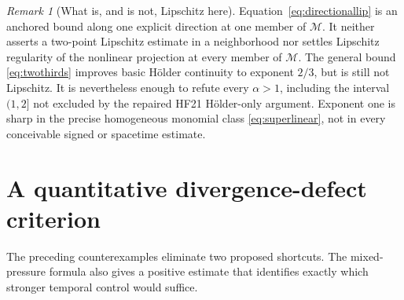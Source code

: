 \documentclass[11pt,a4paper]{article}
\theoremstyle{definition}
\theoremstyle{remark}
\newtheorem{remark}[theorem]{Remark}
\newcommand{\M}{\mathcal M}
\numberwithin{equation}{section}
\begin{document}
\begin{remark}[What is, and is not, Lipschitz here]
Equation~\eqref{eq:directionallip} is an anchored bound along one explicit direction at one member of \(\M\). It neither asserts a two-point Lipschitz estimate in a neighborhood nor settles Lipschitz regularity of the nonlinear projection at every member of \(\M\). The general bound \eqref{eq:twothirds} improves basic Hölder continuity to exponent \(2/3\), but is still not Lipschitz. It is nevertheless enough to refute every \(\alpha>1\), including the interval \((1,2]\) not excluded by the repaired HF21 Hölder-only argument. Exponent one is sharp in the precise homogeneous monomial class \eqref{eq:superlinear}, not in every conceivable signed or spacetime estimate.
\end{remark}

\section{A quantitative divergence-defect criterion}\label{sec:criterion}
The preceding counterexamples eliminate two proposed shortcuts. The mixed-pressure formula also gives a positive estimate that identifies exactly which stronger temporal control would suffice.
\end{document}
